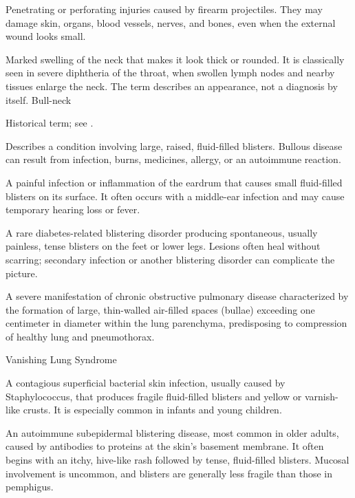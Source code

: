  Penetrating or perforating injuries caused by firearm projectiles. They may damage skin, organs, blood vessels, nerves, and bones, even when the external wound looks small.

 Marked swelling of the neck that makes it look thick or rounded.
It is classically seen in severe diphtheria of the throat, when swollen lymph nodes
and nearby tissues enlarge the neck. The term describes an appearance, not a
diagnosis by itself.
\synonyms
Bull-neck

 Historical term; see .

 Describes a condition involving large, raised, fluid-filled blisters. Bullous disease can result from infection, burns, medicines, allergy, or an autoimmune reaction.

 A painful infection or inflammation of the eardrum that causes small fluid-filled blisters on its surface. It often occurs with a middle-ear infection and may cause temporary hearing loss or fever.

 A rare
diabetes-related blistering disorder producing spontaneous, usually painless,
tense blisters on the feet or lower legs. Lesions often heal without scarring;
secondary infection or another blistering disorder can complicate the picture.

 A severe manifestation of chronic obstructive pulmonary disease characterized by the formation of large, thin-walled air-filled spaces (bullae) exceeding one centimeter in diameter within the lung parenchyma, predisposing to compression of healthy lung and pneumothorax.

\synonyms
Vanishing Lung Syndrome

 A contagious superficial bacterial skin infection, usually caused by Staphylococcus, that produces fragile fluid-filled blisters and yellow or varnish-like crusts. It is especially common in infants and young children.

 An autoimmune subepidermal blistering disease, most common in older adults,
caused by antibodies to proteins at the skin's basement membrane. It often begins with an
itchy, hive-like rash followed by tense, fluid-filled blisters. Mucosal involvement is
uncommon, and blisters are generally less fragile than those in pemphigus.

